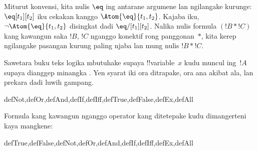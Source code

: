 \documentclass[../../../include/open-logic-section]{subfiles}
\begin{document}
Miturut konvensi, kita nulis $\eq$ ing antarane argumene lan
ngilangake kurunge: $\eq[t_1][t_2]$ iku cekakan kanggo
$\Atom{\eq}{t_1,t_2}$. Kajaba iku, $\lnot \Atom{\eq}{t_1,t_2}$
disingkat dadi $\eq/[t_1][t_2]$. Nalika nulis formula $(!B \ast !C)$
kang kawangun saka $!B$, $!C$ nganggo konektif rong panggonan~$\ast$,
kita kerep ngilangake pasangan kurung paling njaba lan mung nulis
$!B \ast !C$.

\begin{intro}
Sawetara buku teks logika mbutuhake supaya !!{variable}~$x$ kudu
muncul ing~$!A$ supaya
%
%
%
dianggep minangka
.
Yen syarat iki ora ditrapake, ora ana akibat ala, lan prekara dadi
luwih gampang.
\end{intro}

\begin{tagblock}{defNot,defOr,defAnd,defIf,defIff,defTrue,defFalse,defEx,defAll}
\begin{defn}
Formula kang kawangun nganggo operator kang ditetepake kudu dimangerteni
kaya mangkene:

\begin{tagenumerate}{defTrue,defFalse,defNot,defOr,defAnd,defIf,defIff,defEx,defAll}









\end{tagenumerate}
\end{defn}
\end{tagblock}
\end{document}
